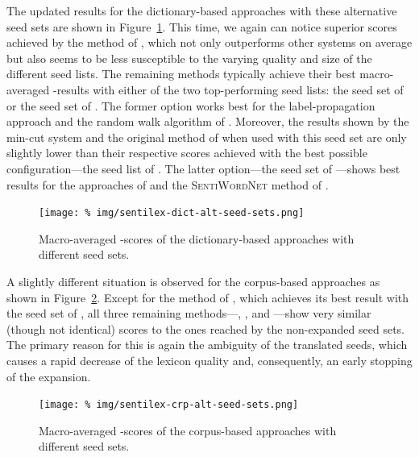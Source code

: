The updated results for the dictionary-based approaches with these
alternative seed sets are shown in
Figure~\ref{snt:fig:sent-dict-lex-alt-seeds}.  This time, we again can
notice superior scores achieved by the method of
\citet{Blair-Goldensohn:08}, which not only outperforms other systems
on average but also seems to be less susceptible to the varying
quality and size of the different seed lists.  The remaining methods
typically achieve their best macro-averaged \F{}-results with either
of the two top-performing seed lists: the seed set of \citet{Kim:04}
or the seed set of \citet{Esuli:06c}.  The former option works best
for the label-propagation approach \citet{Rao:09} and the random walk
algorithm of \citet{Awadallah:10}.  Moreover, the results shown by the
min-cut system \cite{Rao:09} and the original method of \citet{Kim:04}
when used with this seed set are only slightly lower than their
respective scores achieved with the best possible configuration---the
seed list of \citet{Turney:02}.  The latter option---the seed set of
\citet{Esuli:06c}---shows best results for the approaches of
\citet{Hu:04} and the \textsc{SentiWordNet} method of \citet{Esuli:06c}.

\begin{figure}[hbtp!]
  \centering
  \texttt{[image: \%
    img/sentilex-dict-alt-seed-sets.png]}
  \caption{Macro-averaged \F{}-scores of the dictionary-based approaches
    with different seed sets.}\label{snt:fig:sent-dict-lex-alt-seeds}
\end{figure}

A slightly different situation is observed for the corpus-based
approaches as shown in Figure~\ref{snt:fig:sent-crp-lex-alt-seeds}.
Except for the method of \citet{Takamura:05}, which achieves its best
result with the seed set of \citet{Hu:04}, all three remaining
methods---\citet{Velikovich:10}, \citet{Kiritchenko:14}, and
\citet{Severyn:15}---show very similar (though not identical) scores
to the ones reached by the non-expanded seed sets.  The primary reason
for this is again the ambiguity of the translated seeds, which causes
a rapid decrease of the lexicon quality and, consequently, an early
stopping of the expansion.

\begin{figure}[hbtp!]
  \centering
  \texttt{[image: \%
    img/sentilex-crp-alt-seed-sets.png]}
  \caption{Macro-averaged \F{}-scores of the corpus-based approaches
  with different seed sets.}\label{snt:fig:sent-crp-lex-alt-seeds}
\end{figure}


